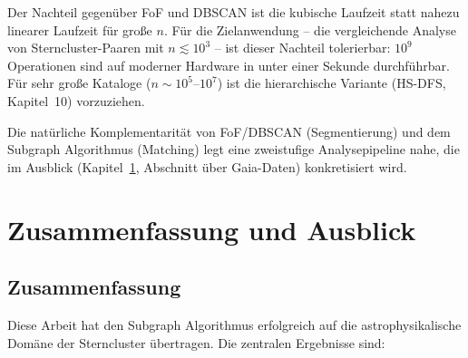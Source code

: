 ﻿\documentclass[a4paper,12pt]{report}
\theoremstyle{definition}
\begin{document}
Der Nachteil gegenüber FoF und DBSCAN ist die kubische Laufzeit statt nahezu linearer Laufzeit für große $n$. Für die Zielanwendung -- die vergleichende Analyse von Sterncluster-Paaren mit $n \lesssim 10^3$ -- ist dieser Nachteil tolerierbar: $10^9$ Operationen sind auf moderner Hardware in unter einer Sekunde durchführbar. Für sehr große Kataloge ($n \sim 10^5$--$10^7$) ist die hierarchische Variante (HS-DFS, Kapitel~10) vorzuziehen.

Die natürliche Komplementarität von FoF/DBSCAN (Segmentierung) und dem Subgraph Algorithmus (Matching) legt eine zweistufige Analysepipeline nahe, die im Ausblick (Kapitel~\ref{chap:zusammenfassung}, Abschnitt über Gaia-Daten) konkretisiert wird.

\chapter{Zusammenfassung und Ausblick}
\label{chap:zusammenfassung}

\section{Zusammenfassung}

Diese Arbeit hat den Subgraph Algorithmus erfolgreich auf die astrophysikalische Domäne der Sterncluster übertragen. Die zentralen Ergebnisse sind:
\end{document}
